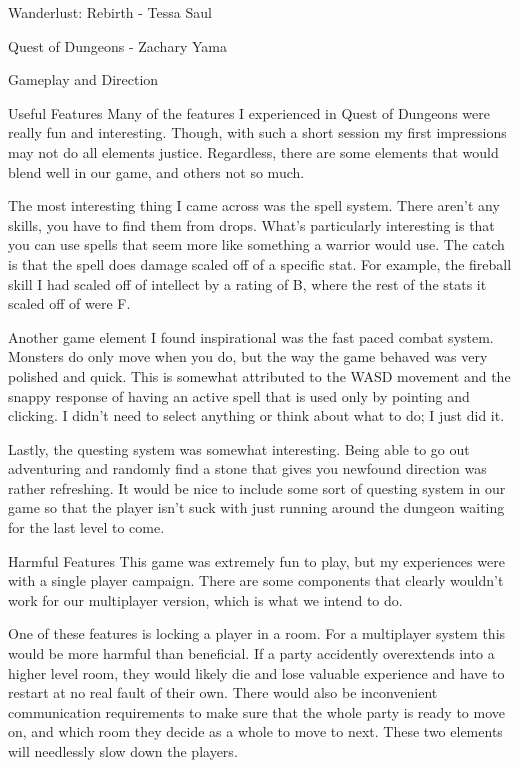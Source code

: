 \documentclass[12pt]{report}
\begin{document}
\begin{section}{Wanderlust: Rebirth - Tessa Saul}
\begin{section}{Quest of Dungeons - Zachary Yama}
\begin{subsection}{Gameplay and Direction}
\end{subsection}
 
\begin{subsection}{Useful Features}
Many of the features I experienced in Quest of Dungeons were really fun and interesting. Though, 
with such a short session my first impressions may not do all elements justice. Regardless, there 
are some elements that would blend well in our game, and others not so much.
 
The most interesting thing I came across was the spell system. There aren’t any skills, you have 
to find them from drops. What’s particularly interesting is that you can use spells that seem more 
like something a warrior would use. The catch is that the spell does damage scaled off of a specific 
stat. For example, the fireball skill I had scaled off of intellect by a rating of B, where the rest 
of the stats it scaled off of were F.
 
Another game element I found inspirational was the fast paced combat system. Monsters do only move 
when you do, but the way the game behaved was very polished and quick. This is somewhat attributed 
to the WASD movement and the snappy response of having an active spell that is used only by pointing 
and clicking. I didn’t need to select anything or think about what to do; I just did it.

Lastly, the questing system was somewhat interesting. Being able to go out adventuring and randomly 
find a stone that gives you newfound direction was rather refreshing. It would be nice to include some
sort of questing system in our game so that the player isn’t suck with just running around the dungeon 
waiting for the last level to come.  
 
\end{subsection}
 
\begin{subsection}{Harmful Features}
This game was extremely fun to play, but my experiences were with a single player campaign. There are 
some components that clearly wouldn’t work for our multiplayer version, which is what we intend to do.
 
One of these features is locking a player in a room. For a multiplayer system this would be more harmful 
than beneficial. If a party accidently overextends into a higher level room, they would likely die and 
lose valuable experience and have to restart at no real fault of their own. There would also be 
inconvenient communication requirements to make sure that the whole party is ready to move on, 
and which room they decide as a whole to move to next. These two elements will needlessly slow down 
the players.
 

\end{subsection}
\end{section}
\end{section}
\end{document}
